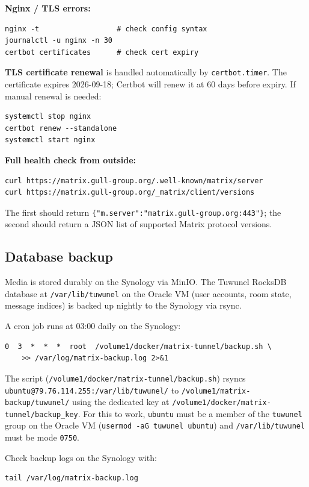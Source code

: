 \documentclass[11pt]{article}
\begin{document}
\textbf{Nginx / TLS errors:}
\begin{verbatim}
nginx -t                  # check config syntax
journalctl -u nginx -n 30
certbot certificates      # check cert expiry
\end{verbatim}

\textbf{TLS certificate renewal} is handled automatically by
\texttt{certbot.timer}.  The certificate expires 2026-09-18; Certbot will
renew it at 60 days before expiry.  If manual renewal is needed:
\begin{verbatim}
systemctl stop nginx
certbot renew --standalone
systemctl start nginx
\end{verbatim}

\textbf{Full health check from outside:}
\begin{verbatim}
curl https://matrix.gull-group.org/.well-known/matrix/server
curl https://matrix.gull-group.org/_matrix/client/versions
\end{verbatim}
The first should return \texttt{\{"m.server":"matrix.gull-group.org:443"\}};
the second should return a JSON list of supported Matrix protocol versions.

\subsection*{Database backup}

Media is stored durably on the Synology via MinIO.  The Tuwunel RocksDB
database at \texttt{/var/lib/tuwunel} on the Oracle VM (user accounts, room
state, message indices) is backed up nightly to the Synology via rsync.

A cron job runs at 03:00 daily on the Synology:

\begin{verbatim}
0  3  *  *  *  root  /volume1/docker/matrix-tunnel/backup.sh \
    >> /var/log/matrix-backup.log 2>&1
\end{verbatim}

The script (\texttt{/volume1/docker/matrix-tunnel/backup.sh}) rsyncs
\texttt{ubuntu@79.76.114.255:/var/lib/tuwunel/} to
\texttt{/volume1/matrix-backup/tuwunel/} using the dedicated key at
\texttt{/volume1/docker/matrix-tunnel/backup\_key}.  For this to work,
\texttt{ubuntu} must be a member of the \texttt{tuwunel} group on the Oracle
VM (\texttt{usermod -aG tuwunel ubuntu}) and \texttt{/var/lib/tuwunel} must
be mode \texttt{0750}.

Check backup logs on the Synology with:
\begin{verbatim}
tail /var/log/matrix-backup.log
\end{verbatim}
\end{document}

